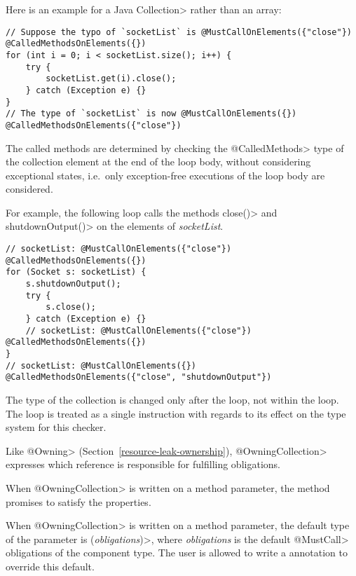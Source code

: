 Here is an example for a Java \<Collection> rather than an array:

\begin{verbatim}
// Suppose the typo of `socketList` is @MustCallOnElements({"close"}) @CalledMethodsOnElements({})
for (int i = 0; i < socketList.size(); i++) {
    try {
        socketList.get(i).close();
    } catch (Exception e) {}
}
// The type of `socketList` is now @MustCallOnElements({}) @CalledMethodsOnElements({"close"})
\end{verbatim}

The called methods are
determined by checking the \<@CalledMethods> type of the collection element at
the end of the loop body, without considering exceptional states, i.e.\ only
exception-free executions of the loop body are considered.

For example, the following loop calls the methods \<close()> and \<shutdownOutput()> on the elements of \textit{socketList}.

\begin{verbatim}
// socketList: @MustCallOnElements({"close"}) @CalledMethodsOnElements({})
for (Socket s: socketList) {
    s.shutdownOutput();
    try {
        s.close();
    } catch (Exception e) {}
    // socketList: @MustCallOnElements({"close"}) @CalledMethodsOnElements({})
}
// socketList: @MustCallOnElements({}) @CalledMethodsOnElements({"close", "shutdownOutput"})
\end{verbatim}

The type of the collection is changed only after the loop, not within the
loop. The loop is treated as a single instruction with regards to its effect on
the type system for this checker.



Like \<@Owning> (Section~\ref{resource-leak-ownership}),
\<@OwningCollection> expresses which reference is responsible for
fulfilling obligations.

When \<@OwningCollection> is written on a method parameter,
the method promises to satisfy the \MustCallOnElements properties.

When \<@OwningCollection> is written on a method parameter, the default
type of the parameter is \MustCallOnElements\<(\textit{obligations})>,
where \textit{obligations} is the default \<@MustCall> obligations of the
component type. The user is allowed to write a
\MustCallOnElements annotation to override this default.

